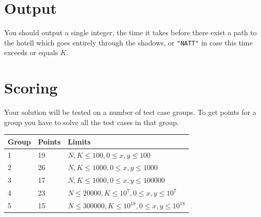 \section*{Output}
You should output a single integer, the time it takes before there exist a path to the hotell which goes entirely through the shadows, or \texttt{"NATT"} in case this time exceeds or equals $K$.

\section*{Scoring}
Your solution will be tested on a number of test case groups. To get points for a group
you have to solve all the test cases in that group.

\begin{tabular}{| l | l | l |}
	\hline
	Group & Points & Limits\\ \hline
	1 & 19 & $N, K \le 100, 0 \le x, y \le 100$ \\ \hline
	2 & 26 & $N, K \le 1000, 0 \le x, y \le 1000$ \\ \hline
	3 & 17 & $N, K \le 1000, 0 \le x, y \le 100000$ \\ \hline
	4 & 23 & $N \le 20000, K \le 10^7, 0 \le x, y \le 10^7$ \\ \hline
	5 & 15 & $N \le 300000, K \le 10^{18}, 0 \le x, y \le 10^{18}$ \\ \hline
\end{tabular}
